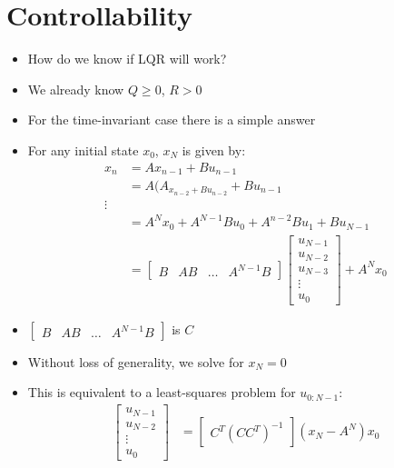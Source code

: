 \documentclass[11pt]{article}
\begin{document}
\section{Controllability}
\begin{itemize}
    \item How do we know if LQR will work?
    \item We already know $Q\geq 0$, $R>0$
    \item For the time-invariant case there is a simple answer
    \item For any initial state $x_0$, $x_N$ is given by:
    \begin{align*}
        x_n &= Ax_{n-1} + Bu_{n-1}
        \\
        &= A(A_{x_{n-2} + Bu_{n-2}} + Bu_{n-1}
        \\
        \vdots
        \\
        &= A^Nx_0 + A^{N-1}Bu_0 + A^{n-2}Bu_1 + Bu_{N-1}
        \\
        &= \begin{bmatrix}
            B & AB & \dots & A^{N-1}B
        \end{bmatrix}
        \begin{bmatrix}
            u_{N-1} \\
            u_{N-2} \\
            u_{N-3}\\
            \vdots \\
            u_0
        \end{bmatrix}
        + A^Nx_0
    \end{align*}
    \item $\begin{bmatrix}
            B & AB & \dots & A^{N-1}B
        \end{bmatrix}$ is $C$
    \item Without loss of generality, we solve for $x_N=0$
    \item This is equivalent to a least-squares problem for $u_{0:N-1}$:
    \begin{align*}
        \begin{bmatrix}
            u_{N-1}\\
            u_{N-2}\\
            \vdots \\
            u_0
        \end{bmatrix}
        &=
        \begin{bmatrix}
            C^T(CC^T)^{-1}
        \end{bmatrix}(x_N - A^N)x_0

\end{align*}
\end{itemize}
\end{document}
